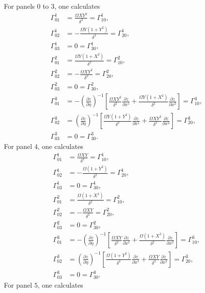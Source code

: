 \documentclass{article}
\begin{document}
For panels $0$ to $3$, one calculates
\begin{align}
\Gamma^1_{01}&=\frac{\Omega XY^2}{\delta^2}=\Gamma^1_{10}, \\
\Gamma^1_{02}&=-\frac{\Omega Y(1+Y^2)}{\delta^2}=\Gamma^1_{20}, \\
\Gamma^1_{03}&=0=\Gamma^1_{30}, \\
\Gamma^2_{01}&=\frac{\Omega Y(1+X^2)}{\delta^2}=\Gamma^2_{10}, \\
\Gamma^2_{02}&=-\frac{\Omega XY^2}{\delta^2}=\Gamma^2_{20}, \\
\Gamma^2_{03}&=0=\Gamma^2_{30}, \\
\Gamma^3_{01}&=-\left(\frac{\partial z}{\partial \eta}\right)^{-1}\left[ \frac{\Omega XY^2}{\delta^2} \frac{\partial z}{\partial x^1}+ \frac{\Omega Y(1+X^2)}{\delta^2} \frac{\partial z}{\partial x^2}  \right]=\Gamma^3_{10}, \\
\Gamma^3_{02}&=\left(\frac{\partial z}{\partial \eta}\right)^{-1}\left[ \frac{\Omega Y(1+Y^2)}{\delta^2} \frac{\partial z}{\partial x^1}+\frac{\Omega XY^2}{\delta^2}\frac{\partial z}{\partial x^2}  \right]=\Gamma^3_{20}, \\
\Gamma^3_{03}&=0=\Gamma^3_{30}.
\end{align}
For panel $4$, one calculates
\begin{align}
\Gamma^1_{01}&=\frac{\Omega XY}{\delta^2}=\Gamma^1_{10}, \\
\Gamma^1_{02}&=-\frac{\Omega (1+Y^2)}{\delta^2}=\Gamma^1_{20}, \\
\Gamma^1_{03}&=0=\Gamma^1_{30}, \\
\Gamma^2_{01}&=\frac{\Omega (1+X^2)}{\delta^2}=\Gamma^2_{10}, \\
\Gamma^2_{02}&=-\frac{\Omega XY}{\delta^2}=\Gamma^2_{20}, \\
\Gamma^2_{03}&=0=\Gamma^2_{30}, \\
\Gamma^3_{01}&=-\left(\frac{\partial z}{\partial \eta}\right)^{-1}\left[ \frac{\Omega XY}{\delta^2} \frac{\partial z}{\partial x^1}+ \frac{\Omega (1+X^2)}{\delta^2} \frac{\partial z}{\partial x^2}  \right]=\Gamma^3_{10}, \\
\Gamma^3_{02}&=\left(\frac{\partial z}{\partial \eta}\right)^{-1}\left[ \frac{\Omega (1+Y^2)}{\delta^2} \frac{\partial z}{\partial x^1}+\frac{\Omega XY}{\delta^2}\frac{\partial z}{\partial x^2}  \right]=\Gamma^3_{20}, \\
\Gamma^3_{03}&=0=\Gamma^3_{30}.
\end{align}
For panel $5$, one calculates
\end{document}
